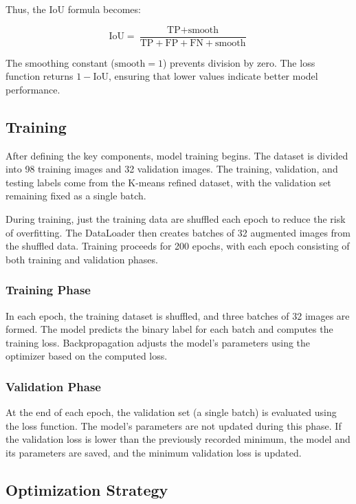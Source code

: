 Thus, the IoU formula becomes:

\begin{equation}
\text{IoU} = \frac{\text{TP} + \text{smooth}}{\text{TP} + \text{FP} + \text{FN} + \text{smooth}}
\label{eq:iou_smooth}
\end{equation}


The smoothing constant (\(\text{smooth} = 1\)) prevents division by zero. The loss function returns \( 1 - \text{IoU} \), ensuring that lower values indicate better model performance.

\subsection{Training}

After defining the key components, model training begins. The dataset is divided into 98 training images and 32 validation images. The training, validation, and testing labels come from the K-means refined dataset, with the validation set remaining fixed as a single batch.

During training, just the training data are shuffled each epoch to reduce the risk of overfitting. The DataLoader then creates batches of 32 augmented images from the shuffled data. Training proceeds for 200 epochs, with each epoch consisting of both training and validation phases.

\subsubsection{Training Phase}

In each epoch, the training dataset is shuffled, and three batches of 32 images are formed. The model predicts the binary label for each batch and computes the training loss. Backpropagation adjusts the model's parameters using the optimizer based on the computed loss.

\subsubsection{Validation Phase}

At the end of each epoch, the validation set (a single batch) is evaluated using the loss function. The model's parameters are not updated during this phase. If the validation loss is lower than the previously recorded minimum, the model and its parameters are saved, and the minimum validation loss is updated.

\subsection{Optimization Strategy}

